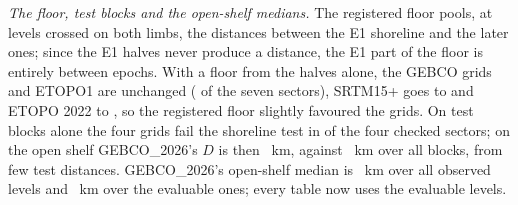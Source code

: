 \emph{The floor, test blocks and the open-shelf medians.} The registered floor pools, at levels crossed on both limbs, the distances between the E1 shoreline and the later ones; since the E1 halves never produce a distance, the E1 part of the floor is entirely between epochs. With a floor from the halves alone, the GEBCO grids and ETOPO1 are unchanged ( of the seven sectors), SRTM15+ goes to  and ETOPO 2022 to , so the registered floor slightly favoured the grids. On test blocks alone the four grids fail the shoreline test in  of the four checked sectors; on the open shelf GEBCO\_2026's $D$ is then ~km, against ~km over all blocks, from few test distances. GEBCO\_2026's open-shelf median is ~km over all  observed levels and ~km over the  evaluable ones; every table now uses the evaluable levels.

